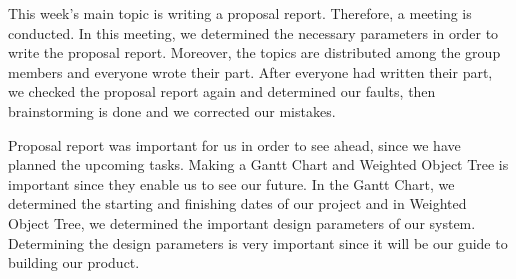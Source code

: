 This week's main topic is writing a proposal report. Therefore, a meeting is conducted. In this meeting, we determined the necessary parameters in order to write the proposal report. Moreover, the topics are distributed among the group members and everyone wrote their part. After everyone had written their part, we checked the proposal report again and determined our faults, then brainstorming is done and we corrected our mistakes. 

Proposal report was important for us in order to see ahead, since we have planned the upcoming tasks. Making a Gantt Chart and Weighted Object Tree is important since they enable us to see our future. In the Gantt Chart, we determined the starting and finishing dates of our project and in Weighted Object Tree, we determined the important design parameters of our system. Determining the design parameters is very important since it will be our guide to building our product.
